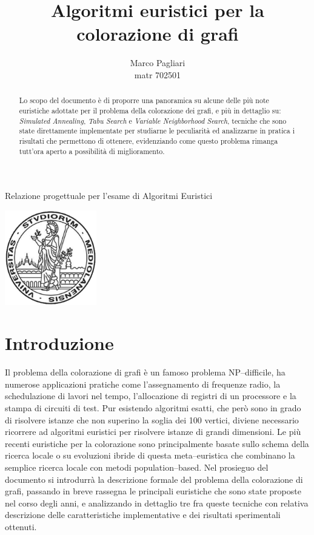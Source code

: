 \documentclass[a4paper,10pt]{article}
\title{Algoritmi euristici per la colorazione di grafi}
\author{Marco Pagliari\\matr 702501}
\begin{document}
\maketitle

\begin{center}
Relazione progettuale per l'esame di Algoritmi Euristici
\end{center}

\vspace{2cm}

\begin{center}
\includegraphics[width=0.3\textwidth]{img/dtiLogo} 
\end{center}

\thispagestyle{empty}

\newpage

\tableofcontents
\listoffigures

\newpage

\begin{abstract}
Lo scopo del documento è di proporre una panoramica su alcune delle più note euristiche adottate per il problema della colorazione dei grafi, e più in dettaglio su: \emph{Simulated Annealing}, \emph{Tabu Search} e \emph{Variable Neighborhood Search}, tecniche che sono state direttamente implementate per studiarne le peculiarità ed analizzarne in pratica i risultati che permettono di ottenere, evidenziando come questo problema rimanga tutt'ora aperto a possibilità di miglioramento.
\end{abstract}

\section{Introduzione}
Il problema della colorazione di grafi è un famoso problema NP--difficile, ha numerose applicazioni pratiche come l'assegnamento di frequenze radio, la schedulazione di lavori nel tempo, l'allocazione di registri di un processore e la stampa di circuiti di test. Pur esistendo algoritmi esatti, che però sono in grado di risolvere istanze che non superino la soglia dei 100 vertici, diviene necessario ricorrere ad algoritmi euristici per risolvere istanze di grandi dimensioni. Le più recenti euristiche per la colorazione sono principalmente basate sullo schema della ricerca locale o su evoluzioni ibride di questa meta--euristica che combinano la semplice ricerca locale con metodi population--based.
Nel prosieguo del documento si introdurrà la descrizione formale del problema della colorazione di grafi, passando in breve rassegna le principali euristiche che sono state proposte nel corso degli anni, e analizzando in dettaglio tre fra queste tecniche con relativa descrizione delle caratteristiche implementative e dei risultati sperimentali ottenuti.
\end{document}
